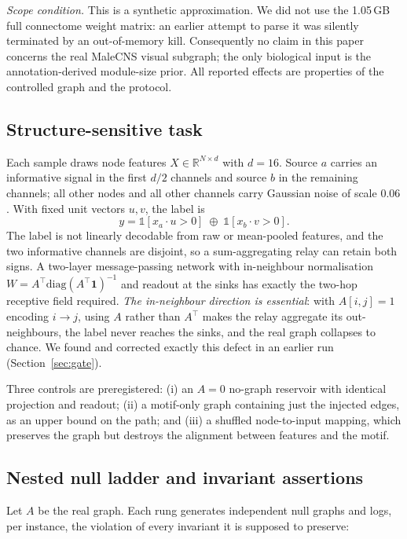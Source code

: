 \documentclass[10pt,twocolumn,letterpaper]{article}
\begin{document}
\emph{Scope condition.} This is a synthetic approximation. We did not
use the 1.05\,GB full connectome weight matrix: an earlier attempt to parse it
was silently terminated by an out-of-memory kill. Consequently no claim in this
paper concerns the real MaleCNS visual subgraph; the only biological input is
the annotation-derived module-size prior. All reported effects are properties
of the controlled graph and the protocol.

\subsection{Structure-sensitive task}
\label{sec:task}

Each sample draws node features $X\in\mathbb{R}^{N\times d}$ with $d=16$.
Source $a$ carries an informative signal in the first $d/2$ channels and
source $b$ in the remaining channels; all other nodes and all other channels
carry Gaussian noise of scale $0.06$. With fixed unit vectors $u,v$, the label
is
\begin{equation}
y = \mathbb{1}[x_a\!\cdot\! u > 0]\;\oplus\;\mathbb{1}[x_b\!\cdot\! v > 0].
\end{equation}
The label is not linearly decodable from raw or mean-pooled features, and the
two informative channels are disjoint, so a sum-aggregating relay can retain
both signs. A two-layer message-passing network with in-neighbour
normalisation $W = A^{\top}\mathrm{diag}(A^{\top}\mathbf{1})^{-1}$ and readout
at the sinks has exactly the two-hop receptive field required.
\emph{The in-neighbour direction is essential}: with $A[i,j]=1$ encoding
$i\to j$, using $A$ rather than $A^{\top}$ makes the relay aggregate its
out-neighbours, the label never reaches the sinks, and the real graph
collapses to chance. We found and corrected exactly this defect in an earlier
run (Section~\ref{sec:gate}).

Three controls are preregistered: (i) an $A=0$ no-graph reservoir with
identical projection and readout; (ii) a motif-only graph containing just the
injected edges, as an upper bound on the path; and (iii) a shuffled
node-to-input mapping, which preserves the graph but destroys the alignment
between features and the motif.

\subsection{Nested null ladder and invariant assertions}
\label{sec:ladder}

Let $A$ be the real graph. Each rung generates independent null graphs and
logs, per instance, the violation of every invariant it is supposed to
preserve:
\end{document}
